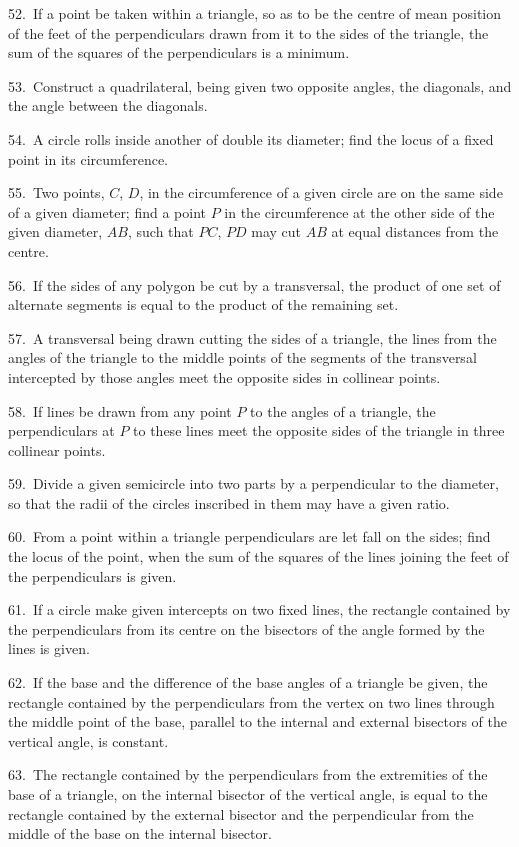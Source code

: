 \documentclass[oneside]{book}
\begin{document}
\begin{footnotesize}
52.~If a point be taken within a triangle, so as to be the centre
of mean position of the feet of the perpendiculars drawn from it
to the sides of the triangle, the sum of the squares of the perpendiculars
is a minimum.

53.~Construct a quadrilateral, being given two opposite angles,
the diagonals, and the angle between the diagonals.

54.~A circle rolls inside another of double its diameter; find
the locus of a fixed point in its circumference.

55.~Two points, $C$, $D$, in the circumference of a given circle are
on the same side of a given diameter; find a point $P$ in the circumference
at the other side of the given diameter, $AB$, such that
$PC$, $PD$ may cut $AB$ at equal distances from the centre.

56.~If the sides of any polygon be cut by a transversal, the
product of one set of alternate segments is equal to the product
of the remaining set.

57.~A transversal being drawn cutting the sides of a triangle,
the lines from the angles of the triangle to the middle points
of the segments of the transversal intercepted by those angles
meet the opposite sides in collinear points.

58.~If lines be drawn from any point $P$ to the angles of a
triangle, the perpendiculars at $P$ to these lines meet the opposite
sides of the triangle in three collinear points.



59.~Divide a given semicircle into two parts by a perpendicular
to the diameter, so that the radii of the circles inscribed in them
may have a given ratio.

60.~From a point within a triangle perpendiculars are let fall
on the sides; find the locus of the point, when the sum of the
squares of the lines joining the feet of the perpendiculars is
given.

61.~If a circle make given intercepts on two fixed lines, the
rectangle contained by the perpendiculars from its centre on the
bisectors of the angle formed by the lines is given.

62.~If the base and the difference of the base angles of a
triangle be given, the rectangle contained by the perpendiculars
from the vertex on two lines through the middle point of the
base, parallel to the internal and external bisectors of the vertical
angle, is constant.

63.~The rectangle contained by the perpendiculars from the
extremities of the base of a triangle, on the internal bisector of
the vertical angle, is equal to the rectangle contained by the
external bisector and the perpendicular from the middle of the
base on the internal bisector.


\end{footnotesize}
\end{document}
